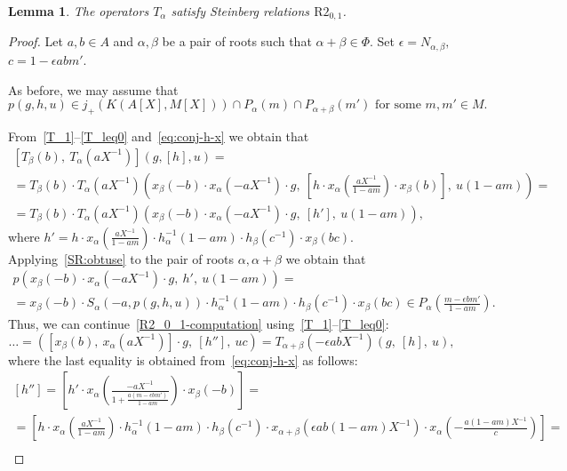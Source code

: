 \documentclass[oneside, 8pt]{amsart}
\newtheorem{lemma}{Lemma}
\theoremstyle{remark}
\theoremstyle{definition}
\numberwithin{lemma}{section}
\numberwithin{prop}{section}
\numberwithin{corollary}{section}
\numberwithin{externaltheorem}{section}
\numberwithin{equation}{section}
\begin{document}
\begin{lemma} \label{R2_0_1} The operators $T_\alpha$ satisfy Steinberg relations $\mathrm{R2}_{0,1}$. \end{lemma}
\begin{proof} 
Let $a, b \in A$ and $\alpha, \beta$ be a pair of roots such that $\alpha + \beta \in \Phi$. Set $\epsilon = N_{\alpha, \beta},$ $c = 1 - \epsilon abm'$.

As before, we may assume that \[p(g, h, u) \in j_+\left(K(A[X], M[X])\right) \cap P_\alpha(m) \cap P_{\alpha + \beta}(m')\text{ for some $m, m' \in M$.} \]

From~\eqref{T_1}--\eqref{T_leq0} and~\eqref{eq:conj-h-x} we obtain that
\begin{multline} \label{R2_0_1-computation}
[T_\beta(b),\ T_\alpha(aX^{-1})] \left(g, [h], u \right) = \\
= T_\beta(b) \cdot T_\alpha(aX^{-1}) \left(x_\beta(-b) \cdot x_\alpha (-a X^{-1})\cdot  g,\ [h\cdot x_\alpha\left(\tfrac{a X^{-1}}{1-am}\right) \cdot x_{\beta}(b)],\ u (1 - am) \right) = \\
= T_\beta(b) \cdot T_\alpha(aX^{-1}) \left(x_\beta(-b) \cdot x_\alpha (-a X^{-1})\cdot  g,\ [h'],\ u (1 - am) \right),
 \end{multline}
 where $h' = h\cdot x_\alpha\left(\tfrac{a X^{-1}}{1-am}\right) \cdot h_{\alpha}^{-1}(1-am)\cdot h_{\beta}(c^{-1}) \cdot x_{\beta}(bc)$. Applying~\cref{SR:obtuse} to the pair of roots $\alpha, \alpha+\beta$ we obtain that
\begin{multline*} p\left(x_\beta(-b) \cdot x_\alpha (-a X^{-1})\cdot  g,\ h',\ u (1 - am) \right) = \\ =
 x_\beta(-b) \cdot S_\alpha(-a, p(g,h,u)) \cdot h_{\alpha}^{-1}(1-am)\cdot h_{\beta}(c^{-1}) \cdot x_{\beta}(bc) \in P_\alpha\left(\tfrac{m-\epsilon bm'}{1-am}\right). \end{multline*}
Thus, we can continue~\eqref{R2_0_1-computation} using~\eqref{T_1}--\eqref{T_leq0}:
\begin{equation} \label{R2_0_1-computation2} \ldots = \left([x_\beta(b),\ x_\alpha(aX^{-1})]\cdot g,\ [h''],\ uc\right) = T_{\alpha+\beta}(-\epsilon abX^{-1})(g,\ [h],\ u), \end{equation} where the last equality is obtained from~\eqref{eq:conj-h-x} as follows:
\begin{multline} \nonumber
 [h''] = \left[ h' \cdot x_\alpha\left(\tfrac{-aX^{-1}}{1+\tfrac{a(m-\epsilon bm')}{1-am}}\right) \cdot x_\beta(-b) \right] = \\ = \left[ h\cdot x_\alpha\left(\tfrac{a X^{-1}}{1-am}\right) \cdot h_{\alpha}^{-1}(1-am)\cdot h_{\beta}(c^{-1})\cdot x_{\alpha + \beta}\left(\epsilon ab(1-am)X^{-1}\right)\cdot x_\alpha\left(-\tfrac{a(1 - am)X^{-1}}{c}\right) \right] = \\

\end{multline}
\end{proof}
\end{document}
